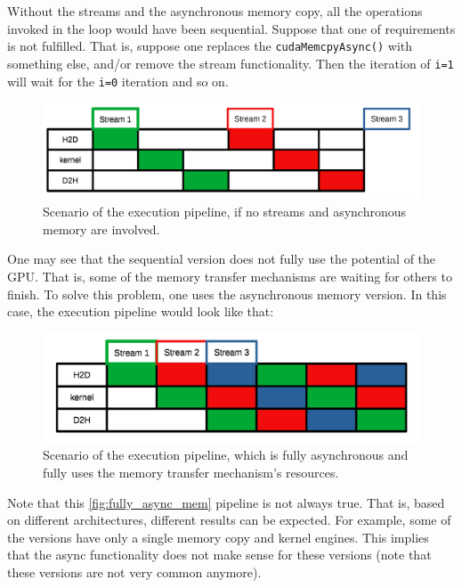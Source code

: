 Without the streams and the asynchronous memory copy, all the operations invoked in the loop would have been sequential. Suppose 
that one of requirements is not fulfilled. That is, suppose one replaces the \verb|cudaMemcpyAsync()| with something else, and/or remove the stream functionality.
Then the iteration of \verb|i=1| will wait for the \verb|i=0| iteration and so on.

\begin{figure}
  \centering 
  \includegraphics[scale=0.15]{pngs/asyncmem-page1.png}
  \caption{Scenario of the execution pipeline, if no streams and asynchronous memory are involved.}
\end{figure}

One may see that the sequential version does not fully use the potential of the GPU. That is, some of the memory 
transfer mechanisms are waiting for others to finish. To solve this problem, one uses the asynchronous memory version.
In this case, the execution pipeline would look like that:

\begin{figure}
  \centering 
  \includegraphics[scale=0.15]{pngs/asyncmem-page2.png}
  \caption{Scenario of the execution pipeline, which is fully asynchronous and fully uses the memory transfer mechanism's resources.}
  \label{fig:fully_async_mem}
\end{figure}

Note that this \autoref{fig:fully_async_mem} pipeline is not always true. That is, based on different architectures, 
different results can be expected. For example, some of the versions have only a single memory copy and kernel engines. 
This implies that the async functionality does not make sense for these versions (note that these versions are not very common anymore).

